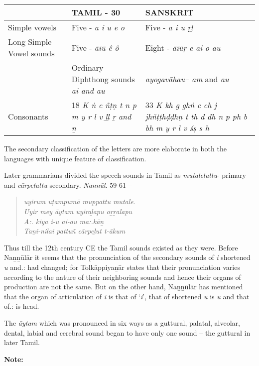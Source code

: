 \begin{longtable}{|p{2.8cm}|p{2.8cm}|p{2.8cm}|}
\hline
 & TAMIL  - 30 & SANSKRIT \\
\hline
Simple vowels & Five  - \textit{a i u e o} & Five - \textit{a i u ṛḻ} \tabularnewline
\hline
Long Simple Vowel sounds & Five - \textit{āīū ê ô} & Eight - \textit{āīūṛ e ai o au} \tabularnewline
\hline
 & Ordinary Diphthong sounds \textit{ai and au} & \textit{ayogavāhau– am} and \textit{au} \tabularnewline
\hline
Consonants & 18 \textit{K ṅ c ñṭṇ t  n  p m y r l v ḻḻ ṟ and ṉ} & 33 \textit{K kh g ghṅ c ch j jhñṭṭhḍḍhṇ t th d dh n p ph b bh m y r l v śṣ s h} \tabularnewline
\hline
\end{longtable}

The secondary classification of the letters are more elaborate in both the languages with unique feature of classification.

Later grammarians divided the speech sounds in Tamil as \textit{mutaleḻuttu}- primary and \textit{cārpeḻuttu} secondary. \textit{Nannūl}. 59-61 –

\begin{verse}
\textit{uyirum uṭampumā muppattu mutale}.\\\textit{Uyir mey āytam uyiraḻapu oṟṟalapu}\\\textit{A:. kiya i-u ai-au ma:.kāṉ}\\\textit{Taṉi-nilai pattuñ cārpeḻut t-ākum} 
\end{verse}

Thus till the 12th century CE the Tamil sounds existed as they were. Before Naṉṉūlār it seems that the pronunciation of the secondary sounds of \textit{i} shortened \textit{u} and.: had changed; for Tolkāppiyaṉār states that their pronunciation varies according to the nature of their neighboring sounds and hence their organs of production are not the same. But on the other hand, Naṉṉūlār has mentioned that the organ of articulation of \textit{i} is that of ‘\textit{i}’, that of shortened \textit{u} is \textit{u} and that of.: is head.

The \textit{āytam} which was pronounced in six ways as a guttural, palatal, alveolar, dental, labial and cerebral sound began to have only one sound – the guttural in later Tamil.

\textbf{Note:}

